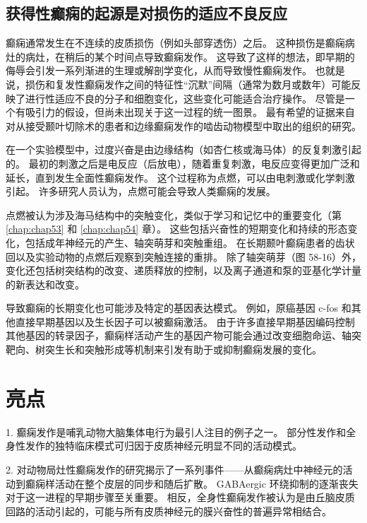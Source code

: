 \subsection{获得性癫痫的起源是对损伤的适应不良反应}

癫痫通常发生在不连续的皮质损伤（例如头部穿透伤）之后。
这种损伤是癫痫病灶的病灶，在稍后的某个时间点导致癫痫发作。
这导致了这样的想法，即早期的侮辱会引发一系列渐进的生理或解剖学变化，从而导致慢性癫痫发作。
也就是说，损伤和复发性癫痫发作之间的特征性“沉默”间隔（通常为数月或数年）可能反映了进行性适应不良的分子和细胞变化，这些变化可能适合治疗操作。
尽管是一个有吸引力的假设，但尚未出现关于这一过程的统一图景。
最有希望的证据来自对从接受颞叶切除术的患者和边缘癫痫发作的啮齿动物模型中取出的组织的研究。


在一个实验模型中，过度兴奋是由边缘结构（如杏仁核或海马体）的反复刺激引起的。
最初的刺激之后是电反应（后放电），随着重复刺激，电反应变得更加广泛和延长，直到发生全面性癫痫发作。
这个过程称为点燃，可以由电刺激或化学刺激引起。
许多研究人员认为，点燃可能会导致人类癫痫的发展。


点燃被认为涉及海马结构中的突触变化，类似于学习和记忆中的重要变化（第 \ref{chap:chap53} 和 \ref{chap:chap54} 章）。
这些包括兴奋性的短期变化和持续的形态变化，包括成年神经元的产生、轴突萌芽和突触重组。
在长期颞叶癫痫患者的齿状回以及实验动物的点燃后观察到突触连接的重排。
除了轴突萌芽（图 58-16）外，变化还包括树突结构的改变、递质释放的控制，以及离子通道和泵的亚基化学计量的新表达和改变。


导致癫痫的长期变化也可能涉及特定的基因表达模式。
例如，原癌基因 c-fos 和其他直接早期基因以及生长因子可以被癫痫激活。
由于许多直接早期基因编码控制其他基因的转录因子，癫痫样活动产生的基因产物可能会通过改变细胞命运、轴突靶向、树突生长和突触形成等机制来引发有助于或抑制癫痫发展的变化。



\section{亮点}

1. 癫痫发作是哺乳动物大脑集体电行为最引人注目的例子之一。
部分性发作和全身性发作的独特临床模式可归因于皮质神经元明显不同的活动模式。


2. 对动物局灶性癫痫发作的研究揭示了一系列事件——从癫痫病灶中神经元的活动到癫痫样活动在整个皮层的同步和随后扩散。
GABAergic 环绕抑制的逐渐丧失对于这一进程的早期步骤至关重要。
相反，全身性癫痫发作被认为是由丘脑皮质回路的活动引起的，可能与所有皮质神经元的膜兴奋性的普遍异常相结合。


